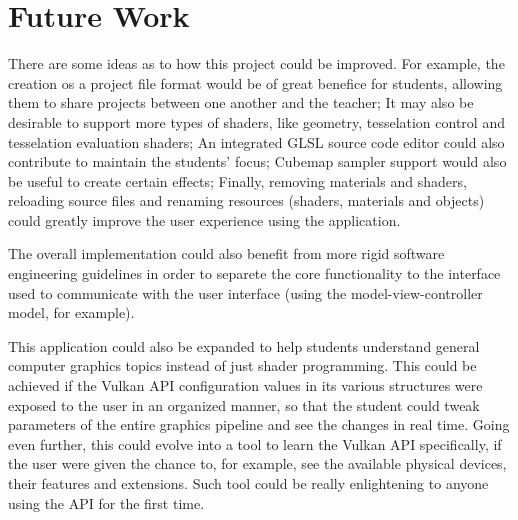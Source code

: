 \section{Future Work}
There are some ideas as to how this project could be improved. For example, the creation os a project file format would be of great benefice for students, allowing them to share projects between one another and the teacher; It may also be desirable to support more types of shaders, like geometry, tesselation control and tesselation evaluation shaders; An integrated GLSL source code editor could also contribute to maintain the students' focus;  Cubemap sampler support would also be useful to create certain effects; Finally, removing materials and shaders, reloading source files and renaming resources (shaders, materials and objects) could greatly improve the user experience using the application.

The overall implementation could also benefit from more rigid software engineering guidelines in order to separete the core functionality to the interface used to communicate with the user interface (using the model-view-controller model, for example).

This application could also be expanded to help students understand general computer graphics topics instead of just shader programming. This could be achieved if the Vulkan API configuration values in its various structures were exposed to the user in an organized manner, so that the student could tweak parameters of the entire graphics pipeline and see the changes in real time. Going even further, this could evolve into a tool to learn the Vulkan API specifically, if the user were given the chance to, for example, see the available physical devices, their features and extensions. Such tool could be really enlightening to anyone using the API for the first time.
